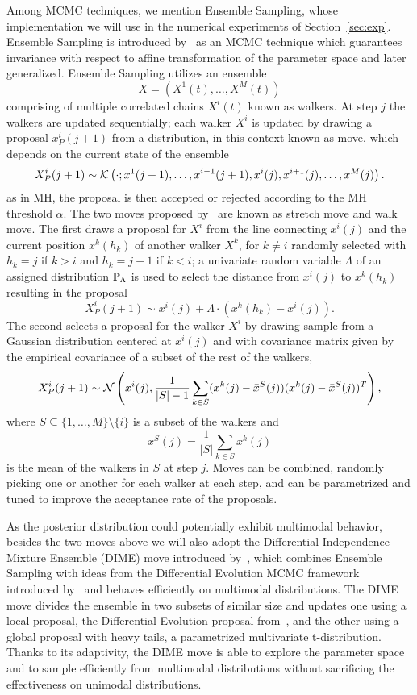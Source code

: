 Among MCMC techniques, we mention Ensemble Sampling, whose implementation we will use in the numerical experiments of Section~\ref{sec:exp}.
Ensemble Sampling is introduced by~\cite{GoodmanWeare} as an MCMC technique which guarantees invariance with respect to affine transformation of the parameter space and later generalized.
Ensemble Sampling utilizes an ensemble 
\[
X =\left(X^1(t), \dots , X^M(t)\right)
\] 
comprising of multiple correlated chains $X^i(t)$ known as walkers.
At step $j$ the walkers are updated sequentially; each walker $X^i$ is updated by drawing a proposal $x^i_P(j+1)$ from a distribution, in this context known as move, which depends on the current state of the ensemble 
\[
  X^i_P(j+1) \sim \mathcal K\left( \cdot ; x^1(j+1), \dots, x^{i-1}(j+1), x^i(j), x^{i+1}(j), \dots, x^M(j)\right).
\] as in MH, the proposal is then accepted or rejected according to the MH threshold $\alpha$. \newline
The two moves proposed by~\cite{GoodmanWeare} are known as stretch move and walk move.
The first draws a proposal for $X^i$ from the line connecting $x^i(j)$ and the current position $x^k(h_k)$ of another walker $X^k$, for $k \neq i$ randomly selected with $h_k = j$ if $k > i$ and $h_k = j+1$ if $k < i$; a univariate random variable $\Lambda$ of an assigned distribution $\mathbb P_\Lambda$ is used to select the distance from $x^i(j)$ to $x^k(h_k)$ resulting in the proposal
\begin{equation}\label{eq:stretch-move}
    X^i_P(j+1) \sim x^i(j) + \Lambda \cdot (x^k(h_k) - x^i(j)).
\end{equation}
The second selects a proposal for the walker $X^i$ by drawing sample from a Gaussian distribution centered at $x^i(j)$ and with covariance matrix given by the empirical covariance of a subset of the rest of the walkers,
\begin{equation}\label{eq:walk-move}
    X^i_P(j+1) \sim \mathcal N\left( x^i(j), \frac{1}{|S|-1} \sum_{k \in S} (x^k(j) - \bar x^S(j))(x^k(j) - \bar x^S(j))^T \right),
\end{equation}
where $S \subseteq \{1, \dots, M\} \setminus \{i\}$ is a subset of the walkers and \[\bar x^S(j) = \frac{1}{|S|}\sum_{k \in S} x^k(j)\] is the mean of the walkers in $S$ at step $j$.
Moves can be combined, randomly picking one or another for each walker at each step, and can be parametrized and tuned to improve the acceptance rate of the proposals.

As the posterior distribution could potentially exhibit multimodal behavior, besides the two moves above we will also adopt the Differential-Independence Mixture Ensemble (DIME) move introduced by~\cite{Boehl}, which combines Ensemble Sampling with ideas from the Differential Evolution MCMC framework introduced by~\cite{TerBraak} and behaves efficiently on multimodal distributions. 
The DIME move divides the ensemble in two subsets of similar size and updates one using a local proposal, the Differential Evolution proposal from~\cite{TerBraak}, and the other using a global proposal with heavy tails, a parametrized multivariate t-distribution.
Thanks to its adaptivity, the DIME move is able to explore the parameter space and to sample efficiently from multimodal distributions without sacrificing the effectiveness on unimodal distributions.


